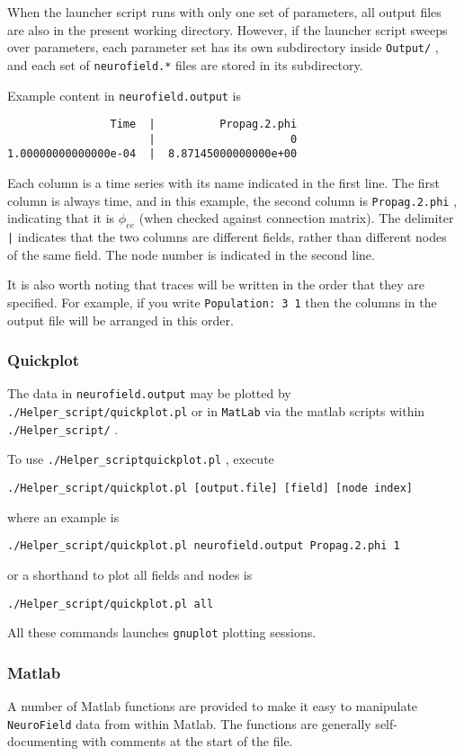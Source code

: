 \documentclass[12pt,a4paper]{article}
\newcommand{\type}[1]{ {\small\small\tt #1} }
\newcommand{\NF}[0]{ \type{NeuroField}}
\begin{document}
When the launcher script runs with only one set of parameters, all output files are also in the present working directory. However, if the launcher script sweeps over parameters, each parameter set has its own subdirectory inside \type{Output/}, and each set of \type{neurofield.*} files are stored in its subdirectory.

Example content in \type{neurofield.output} is
\begin{lstlisting}
                Time  |          Propag.2.phi
                      |                     0
1.00000000000000e-04  |  8.87145000000000e+00
\end{lstlisting}

Each column is a time series with its name indicated in the first line. The first column is always time, and in this example, the second column is \type{Propag.2.phi}, indicating that it is $\phi_{ee}$ (when checked against connection matrix). The delimiter \type{|} indicates that the two columns are different fields, rather than different nodes of the same field. The node number is indicated in the second line.

It is also worth noting that traces will be written in the order that they are specified. For example, if you write \type{Population: 3 1} then the columns in the output file will be arranged in this order. 

\subsubsection{Quickplot}

The data in \type{neurofield.output} may be plotted by \type{./Helper\_script/quickplot.pl} or in \type{MatLab} via the matlab scripts within \type{./Helper\_script/}.

To use \type{./Helper\_script\/quickplot.pl}, execute
\begin{lstlisting}
./Helper_script/quickplot.pl [output.file] [field] [node index]
\end{lstlisting}
where an example is
\begin{lstlisting}
./Helper_script/quickplot.pl neurofield.output Propag.2.phi 1
\end{lstlisting}
or a shorthand to plot all fields and nodes is
\begin{lstlisting}
./Helper_script/quickplot.pl all
\end{lstlisting}
All these commands launches \type{gnuplot} plotting sessions.

\subsubsection{Matlab}
A number of Matlab functions are provided to make it easy to manipulate \NF data from within Matlab. The functions are generally self-documenting with comments at the start of the file.
\end{document}
